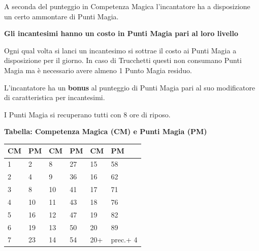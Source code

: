 \begin{multicols}{2}
A seconda del punteggio in Competenza Magica l'incantatore ha a disposizione un certo ammontare di Punti Magia.

\textbf{Gli incantesimi hanno un costo in Punti Magia pari al loro livello}


Ogni qual volta si lanci un incantesimo si sottrae il costo ai Punti Magia a disposizione per il giorno.
In caso di Trucchetti questi non consumano Punti Magia ma è necessario avere almeno 1 Punto Magia residuo.

L'incantatore ha un \textbf{bonus} al punteggio di Punti Magia pari al suo modificatore di caratteristica per incantesimi.

I Punti Magia si recuperano tutti con 8 ore di riposo. 

\medskip

\textbf{Tabella: Competenza Magica (CM) e Punti Magia (PM)}

\medskip

\noindent\begin{tabularx}{0.45\textwidth}{XX|XX|XX}
\textbf{CM} & \textbf{PM}&\textbf{CM} & \textbf{PM}&\textbf{CM} & \textbf{PM}\\
\hline
1&2 &8&27&15&58\\
2&4&9&36&16&62\\
3&8&10&41&17&71\\
4&10&11&43&18&76\\
5&16&12&47&19&82\\
6&19&13&50&20&89\\
7&23&14&54&20+&prec.+ 4
\end{tabularx}




\end{multicols}
